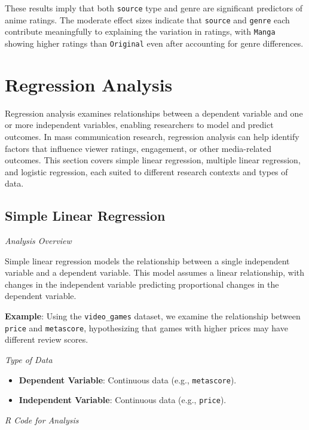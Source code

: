 \documentclass[
]{book}
\providecommand{\tightlist}{%
  \setlength{\itemsep}{0pt}\setlength{\parskip}{0pt}}
\begin{document}
These results imply that both \texttt{source} type and genre are significant predictors of anime ratings. The moderate effect sizes indicate that \texttt{source} and \texttt{genre} each contribute meaningfully to explaining the variation in ratings, with \texttt{Manga} showing higher ratings than \texttt{Original} even after accounting for genre differences.

\section{Regression Analysis}\label{regression-analysis}

Regression analysis examines relationships between a dependent variable and one or more independent variables, enabling researchers to model and predict outcomes. In mass communication research, regression analysis can help identify factors that influence viewer ratings, engagement, or other media-related outcomes. This section covers simple linear regression, multiple linear regression, and logistic regression, each suited to different research contexts and types of data.

\subsection*{Simple Linear Regression}\label{simple-linear-regression}

\emph{Analysis Overview}

Simple linear regression models the relationship between a single independent variable and a dependent variable. This model assumes a linear relationship, with changes in the independent variable predicting proportional changes in the dependent variable.

\textbf{Example}: Using the \texttt{video\_games} dataset, we examine the relationship between \texttt{price} and \texttt{metascore}, hypothesizing that games with higher prices may have different review scores.

\emph{Type of Data}

\begin{itemize}
\tightlist
\item
  \textbf{Dependent Variable}: Continuous data (e.g., \texttt{metascore}).
\item
  \textbf{Independent Variable}: Continuous data (e.g., \texttt{price}).
\end{itemize}

\emph{R Code for Analysis}
\end{document}
